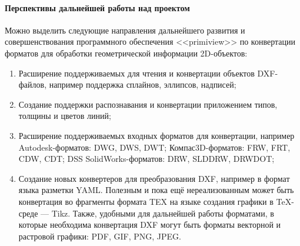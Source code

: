 \paragraph{Перспективы дальнейшей работы над проектом} 
\nopagebreak

Можно выделить следующие направления дальнейшего развития и совершенствования программного обеспечения <<primiview>> по конвертации форматов для обработки геометрической информации 2D-объектов:

\begin{enumerate}[1)]
	\item Расширение поддерживаемых для чтения и конвертации объектов DXF-файлов, например поддержка сплайнов, эллипсов, надписей;
	\item Создание поддержки распознавания и конвертации приложением типов, толщины и цветов линий;
	\item Расширение поддерживаемых входных форматов для конвертации, например Autodesk-форматов: DWG, DWS, DWT; Компас3D-форматов: FRW, FRT, CDW, CDT; DSS SolidWorks-форматов: DRW, SLDDRW, DRWDOT;
	\item Создание новых конвертеров для преобразования DXF, например в формат языка разметки YAML. Полезным и пока ещё нереализованным может быть конвертация во фрагменты формата TEX на языке создания графики в \TeX-среде --- Tikz. Также, удобными для дальнейшей работы форматами, в которые необходима конвертация DXF могут быть форматы векторной и растровой графики: PDF, GIF, PNG, JPEG.
\end{enumerate}


